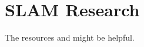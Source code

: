 \documentclass[a4paper,12pt]{article}
\begin{document}
\section{SLAM Research}
The resources \cite{a1678144} and \cite{a938381} might be helpful.


\end{document}
